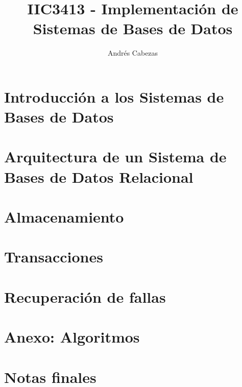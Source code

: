 \documentclass{report}
\title{IIC3413 - Implementación de Sistemas de Bases de Datos}
\author{Andrés Cabezas}
\begin{document}
\maketitle

\tableofcontents

\chapter{Introducción a los Sistemas de Bases de Datos}


\chapter{Arquitectura de un Sistema de Bases de Datos Relacional}


\chapter{Almacenamiento}


\chapter{Transacciones}


\chapter{Recuperaci\'on de fallas}


\chapter{Anexo: Algoritmos}


\chapter{Notas finales}

\end{document}
